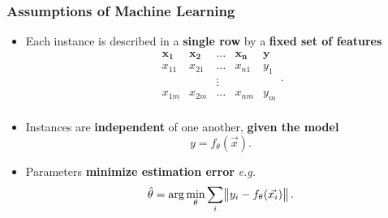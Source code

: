 \documentclass[bigger,xcolor={x11names,svgnames}]{beamer}
\begin{document}
%
\begin{frame}
    \frametitle{Assumptions of Machine Learning}
    \begin{itemize}
        \item Each instance is described in a \textbf{single row} by a \textbf{fixed set of features}
              $$
                  \begin{array}{cccc|c}
                      \mathbf{x_1} & \mathbf{x_2} & \ldots & \mathbf{x_n} & \mathbf{y} \\
                      \hline
                      x_{11}       & x_{21}       & \ldots & x_{n1}       & y_1        \\
                                   &              & \vdots                             \\
                      x_{1m}       & x_{2m}       & \ldots & x_{nm}       & y_m        \\
                  \end{array}
                  .$$
        \item Instances are \textbf{independent} of one another, \textbf{given the model}
              $$
                  y = f_\theta(\vec{x}).
              $$
        \item Parameters \textbf{minimize estimation error} \emph{e.g.}
              $$
                  \hat{\theta} = \arg\min_\theta \sum_i \norm{y_i - f_\theta(\vec{x_{i}})}.
              $$
    \end{itemize}
\end{frame}
%
\end{document}
